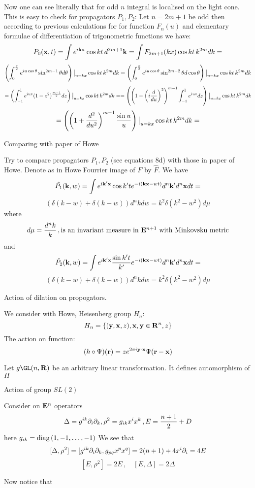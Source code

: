 Now one can see literally that for odd $n$ integral is localised
on the light cone. This is easy to check for propagators $P_1,P_2$:
 Let $n=2m+1$ be odd then according to previous calculations for
for function $F_n(u)$ and elementary formulae of differentiation of
trigonometric functions we have:
            $$
P_0({\bf x},t)=
   \int e^{i{\bf k}{\bf x}}\cos kt\, d^{2m+1}{\bf k} =
   \int F_{2m+1}(kx)\cos kt\, k^{2m}dk =
            $$
           $$
\left(\int_0^{\pi\over 2} 
e^{iu\cos\theta}\sin^{2m-1}\theta d\theta\right)\big\vert_{u=kx}
      \cos kt\, k^{2m}dk=
\left(\int_0^{\pi\over 2} 
e^{iu\cos\theta}\sin^{2m-2}\theta d\cos\theta\right)\big\vert_{u=kx}
      \cos kt\, k^{2m}dk
          $$
           $$
=\left(\int_{-1}^1 e^{iuz}(1-z^2)^{m-1\over 2}dz\right)\big\vert_{u=kx}
      \cos kt\, k^{2m}dk=
=\left(\left(1-\left(i{d\over du}\right)^2\right)^{m-1}
\int_{-1}^1 e^{iuz}dz\right)\big\vert_{u=kx}
      \cos kt\, k^{2m}dk
             $$
             $$
=\left(\left(1+{d^2\over du^2}\right)^{m-1}
    {\sin u\over u}\right)\big\vert_{u=kx}
      \cos kt\, k^{2m}dk=
           $$


\centerline {Comparing with paper of Howe}

Try to compare propagators $P_1,P_2$ (see equations 8d) with
those in paper of Howe.
   Denote as in Howe Fourrier image of $F$ by $\hat F$. We have
        $$
\hat {P_1}({\bf k},w)=
\int e^{i{\bf k}'{\bf x}}\cos k't e^{-i({\bf k}{\bf x}-wt)}d^n{\bf k}'d^n{\bf x} dt=
        $$
        $$
\left(\delta(k-w)+\delta(k-w)\right)d^nk dw=
k^2\delta(k^2-w^2)d\mu
        $$
where
      $$
d\mu={d^nk\over k}\,,\hbox{is an invariant measure in ${\bf E}^{n+1}$ with
  Minkovsku metric}
     $$
and      $$
\hat {P_2}({\bf k},w)=
\int e^{i{\bf k}'{\bf x}}{\sin k't\over k'} e^{-i({\bf k}{\bf x}-wt)}d^n{\bf k}'d^n{\bf x} dt=
        $$
        $$
\left(\delta(k-w)+\delta(k-w)\right)d^nk dw=
k^2\delta(k^2-w^2)d\mu
        $$

\centerline {Action of dilation on propogators.}

   We consider with Howe, Heisenberg  group $H_n$:
               $$
     H_n=\{({\bf y},{\bf x},z), {\bf x},{\bf y}\in {\bf R}^n, z\}
               $$
The action on function:
                $$
   (h\circ \Psi)({\bf r})=ze^{2\pi i {\bf y}\cdot {\bf x}}\Psi({\bf r}-{\bf x})
                $$




Let  $g\GL(n,\R)$ be an arbitrary linear transformation.
It defines automorphism of $H$
           





 \centerline { Action of group $SL(2)$}



Consider on ${\bf E}^n$ operators
         $$
\Delta=g^{ik}\partial_i\partial_k,   \rho^2=g_{ik}x^ix^k\,, E={n+1\over 2}+D
         $$
here $g_{ik}={\rm diag\,}(1,-1,\dots,-1)$
We see that
        $$
[\Delta,\rho^2]=[g^{ik}\partial_i\partial_k, g_{pq}x^px^q]=2(n+1)+4x^i\partial_i=4E
        $$
         $$
[E,\rho^2]=2E\,,\quad [E,\Delta]=2\Delta 
         $$

Now notice that


\bye
